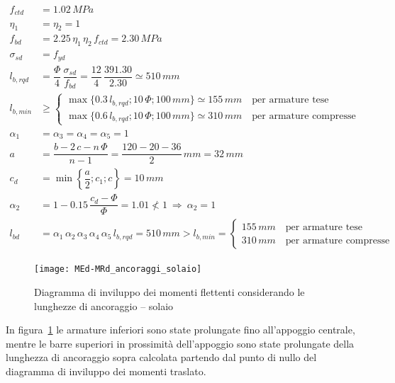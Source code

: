 \begin{align*}
	f_{ctd} &= 1.02\,MPa\\
	\eta_1 &= \eta_2 = 1\\
	f_{bd} &= 2.25\,\eta_1\,\eta_2\,f_{ctd} = 2.30\,MPa\\
	\sigma_{sd} &= f_{yd}\\
	l_{b,rqd} &= \dfrac{\Phi}{4}\,\dfrac{\sigma_{sd}}{f_{bd}} = \dfrac{12}{4}\,\dfrac{391.30}{2.30} \simeq510\,mm \\
	l_{b,min} &\geq \begin{cases}
		\max\{0.3\,l_{b,rqd}; 10\,\Phi; 100\,mm\} \simeq 155\,mm \quad \text{per armature tese}\\
		\max\{0.6\,l_{b,rqd}; 10\,\Phi; 100\,mm\} \simeq 310\,mm \quad \text{per armature compresse}
	\end{cases}\\
	\alpha_1 &= \alpha_3 = \alpha_4 = \alpha_5 = 1 \\
	a &= \dfrac{b - 2\,c-n\,\Phi}{n-1} = \dfrac{120-20-36}{2}\,mm = 32\,mm\\
	c_d &= \min\left\{\dfrac{a}{2}; c_1; c\right\} = 10\,mm\\
	\alpha_2 &= 1-0.15\,\dfrac{c_d - \Phi}{\Phi} = 1.01 \nless 1 ~ \Longrightarrow~ \alpha_2 = 1\\
	l_{bd} &= \alpha_1\,\alpha_2\,\alpha_3\,\alpha_4\,\alpha_5\,l_{b,rqd} = 510\,mm  > l_{b,min} = \begin{cases}
		155\,mm \quad \text{per armature tese}\\                                                                                              
		310\,mm \quad \text{per armature compresse}                                                                                              \end{cases}
\end{align*}

\begin{figure}
	\centering
	\texttt{[image: MEd-MRd\_ancoraggi\_solaio]}
	\caption{Diagramma di inviluppo dei momenti flettenti considerando le lunghezze di ancoraggio -- solaio}
	\label{fig:MEd-MRd_ancoraggi_solaio}
\end{figure}

In figura~\ref{fig:MEd-MRd_ancoraggi_solaio} le armature inferiori sono state prolungate fino all'appoggio centrale, mentre le barre superiori in prossimità dell'appoggio sono state prolungate della lunghezza di ancoraggio sopra calcolata partendo dal punto di nullo del diagramma di inviluppo dei momenti traslato.

